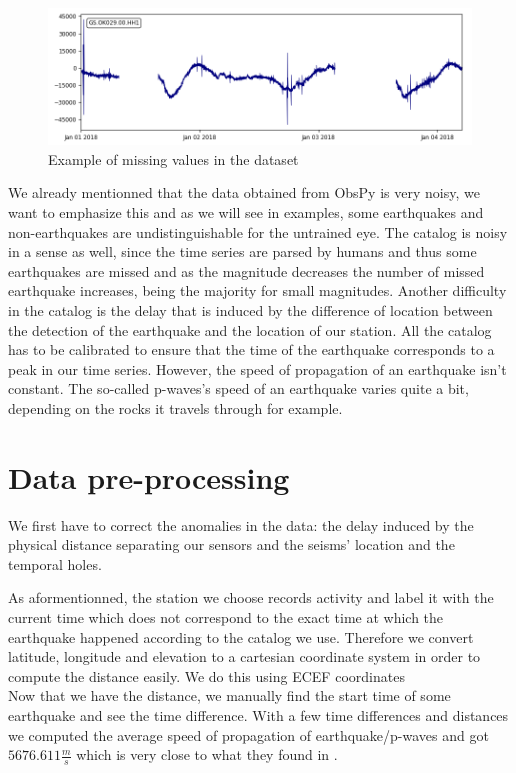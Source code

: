 \documentclass[10pt,conference,compsocconf]{IEEEtran}
\begin{document}
\begin{figure}[h]
  \centering
	\includegraphics[width=\columnwidth]{hole_example.png}
  \caption{Example of missing values in the dataset}
	\label{fig:10min-example}
\end{figure}

We already mentionned that the data obtained from ObsPy is very noisy, we want to emphasize this and as we will see in examples, some earthquakes and non-earthquakes are undistinguishable for the untrained eye. The catalog is noisy in a sense as well, since the time series are parsed by humans and thus some earthquakes are missed and as the magnitude decreases the number of missed earthquake increases, being the majority for small magnitudes. Another difficulty in the catalog is the delay that is induced by the difference of location between the detection of the earthquake and the location of our station. All the catalog has to be calibrated to ensure that the time of the earthquake corresponds to a peak in our time series. However, the speed of propagation of an earthquake isn't constant. The so-called p-waves's speed of an earthquake varies quite a bit, depending on the rocks it travels through for example.

\section{Data pre-processing}
We first have to correct the anomalies in the data: the delay induced by the physical distance separating our sensors and the seisms' location and the temporal holes.\newline

As aformentionned, the station we choose records activity and label it with the current time which does not correspond to the exact time at which the earthquake happened according to the catalog we use. Therefore we convert latitude, longitude and elevation to a cartesian coordinate system in order to compute the distance easily. We do this using ECEF coordinates\cite{ECEFPaper}\\
Now that we have the distance, we manually find the start time of some earthquake and see the time difference. With a few time differences and distances we computed the average speed of propagation of earthquake/p-waves and got $5676.611\frac{m}{s}$ which is very close to what they found in \cite{PWavePaper}.
\end{document}
